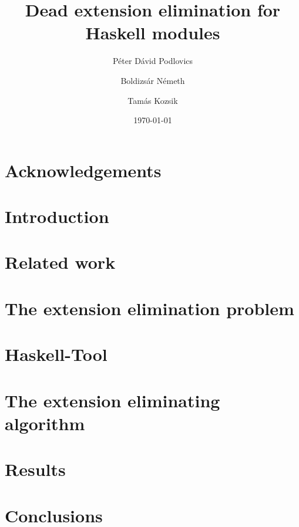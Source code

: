 \documentclass[11pt]{amsart}
\title{Dead extension elimination for Haskell modules}
\date{\today}
\author{Péter Dávid Podlovics}
\author{Boldizsár Németh}
\author{Tamás Kozsik}
\begin{document}
	
	
	\maketitle

	\section{Acknowledgements}
	

	\section{Introduction}
	
	
	\vspace{-0.2cm}
	\section{Related work}
	
	
	\section{The extension elimination problem} \label{ext-elim_problem}
	
	
	\section{Haskell-Tool}
	
	
	\section{The extension eliminating algorithm} \label{algorithm}
	
	
	\section{Results}
	
	
	\section{Conclusions}
	
	
	
	
\end{document}
